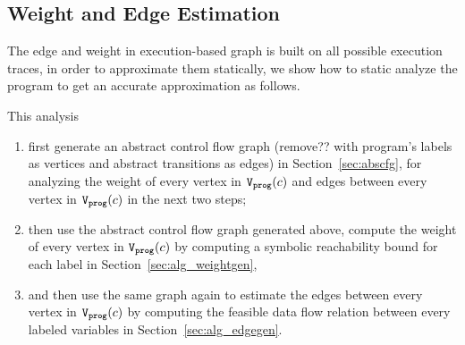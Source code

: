 \subsection{Weight and Edge Estimation}
\label{sec:alg_weightedgegen}
The edge and weight in execution-based graph is built on all possible execution traces,
in order to approximate them statically, we show how to static analyze the program to 
get an accurate approximation as follows.

This analysis
\begin{enumerate}
    \item first generate 
    an abstract control flow graph
    (remove?? with program's labels as vertices and abstract transitions as edges)
    in Section~\ref{sec:abscfg},
    for analyzing the weight of every vertex in $\mathtt{{V_{prog}}}(c)$ and edges between every vertex in $\mathtt{{V_{prog}}}(c)$ in the next two steps;

    \item then use the abstract control flow graph generated above, 
    compute the weight of every vertex in $\mathtt{{V_{prog}}}(c)$ by computing a symbolic reachability bound for each label in Section~\ref{sec:alg_weightgen},
    \item and then use the same graph again to estimate the edges between every vertex in $\mathtt{{V_{prog}}}(c)$ by computing the feasible data flow relation between every labeled variables in Section~\ref{sec:alg_edgegen}.
  
\end{enumerate}
